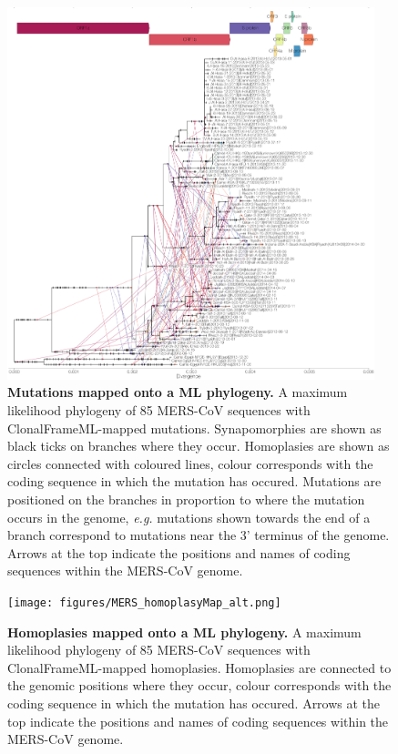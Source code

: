 \documentclass[11pt,oneside,letterpaper]{article}
\begin{document}
\begin{figure}[h!]
	\centering
	\includegraphics[width=0.95\textwidth]{figures/MERS_homoplasyMap.png}
	\caption{\textbf{Mutations mapped onto a ML phylogeny.}
A maximum likelihood phylogeny of 85 MERS-CoV sequences with ClonalFrameML-mapped mutations.
Synapomorphies are shown as black ticks on branches where they occur.
Homoplasies are shown as circles connected with coloured lines, colour corresponds with the coding sequence in which the mutation has occured.
Mutations are positioned on the branches in proportion to where the mutation occurs in the genome, \textit{e.g.} mutations shown towards the end of a branch correspond to mutations near the 3' terminus of the genome.
Arrows at the top indicate the positions and names of coding sequences within the MERS-CoV genome.}
	\label{homoplasyTree}
\end{figure}

\begin{figure}[h!]
	\centering
	\texttt{[image: figures/MERS\_homoplasyMap\_alt.png]}
	\caption{\textbf{Homoplasies mapped onto a ML phylogeny.}
A maximum likelihood phylogeny of 85 MERS-CoV sequences with ClonalFrameML-mapped homoplasies.
Homoplasies are connected to the genomic positions where they occur, colour corresponds with the coding sequence in which the mutation has occured.
Arrows at the top indicate the positions and names of coding sequences within the MERS-CoV genome.}
	\label{homoplasyTree_alt}
\end{figure}
\end{document}
